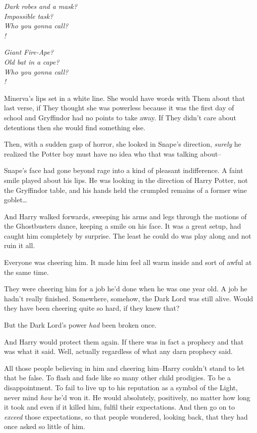 \begin{center}
\emph{Dark robes and a mask?\\
Impossible task?\\
Who you gonna call?\\
!}

\emph{Giant Fire-Ape?\\
Old bat in a cape?\\
Who you gonna call?\\
!}
\end{center}

Minerva's lips set in a white line. She would have words with Them about that last verse, if They thought she was powerless because it was the first day of school and Gryffindor had no points to take away. If They didn't care about detentions then she would find something else.

Then, with a sudden gasp of horror, she looked in Snape's direction, \emph{surely} he realized the Potter boy must have no idea who that was talking about\---

Snape's face had gone beyond rage into a kind of pleasant indifference. A faint smile played about his lips. He was looking in the direction of Harry Potter, not the Gryffindor table, and his hands held the crumpled remains of a former wine goblet{\ldots}

And Harry walked forwards, sweeping his arms and legs through the motions of the Ghostbusters dance, keeping a smile on his face. It was a great setup, had caught him completely by surprise. The least he could do was play along and not ruin it all.

Everyone was cheering him. It made him feel all warm inside and sort of awful at the same time.

They were cheering him for a job he'd done when he was one year old. A job he hadn't really finished. Somewhere, somehow, the Dark Lord was still alive. Would they have been cheering quite so hard, if they knew that?

But the Dark Lord's power \emph{had} been broken once.

And Harry would protect them again. If there was in fact a prophecy and that was what it said. Well, actually regardless of what any darn prophecy said.

All those people believing in him and cheering him\---Harry couldn't stand to let that be false. To flash and fade like so many other child prodigies. To be a disappointment. To fail to live up to his reputation as a symbol of the Light, never mind \emph{how} he'd won it. He would absolutely, positively, no matter how long it took and even if it killed him, fulfil their expectations. And then go on to \emph{exceed} those expectations, so that people wondered, looking back, that they had once asked so little of him.

